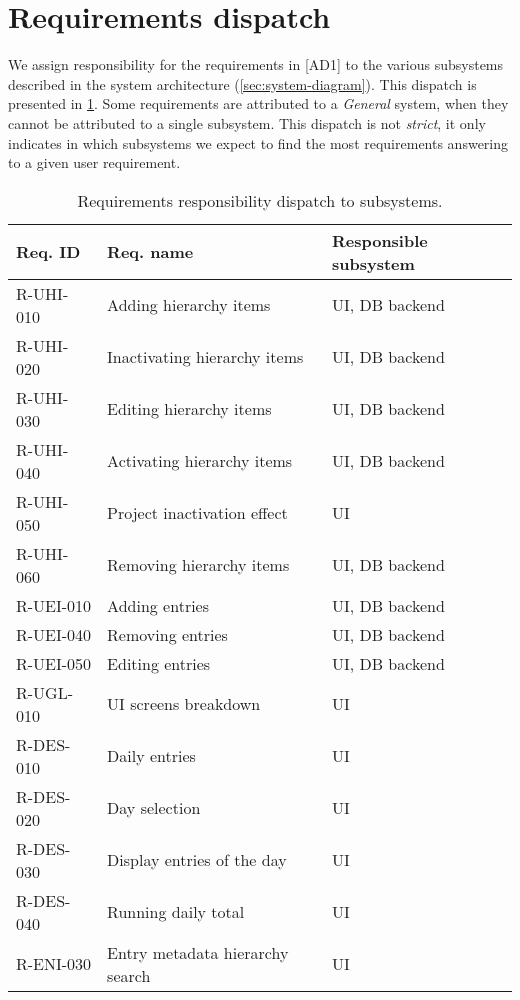 \section{Requirements dispatch} \label{sec:req-dispatch}
We assign responsibility for the requirements in [AD1] to the various subsystems
described in the system architecture (\cref{sec:system-diagram}). This dispatch
is presented in \cref{tab:req-dispatch}. Some requirements are attributed
to a \emph{General} system, when they cannot be attributed to a single
subsystem. This dispatch is not \emph{strict}, it only indicates in which
subsystems we expect to find the most requirements answering to a given
user requirement.

\begin{longtable}{| p{} |
                    p{} |
                    p{} |}
  \caption{\label{tab:req-dispatch} Requirements responsibility dispatch to
    subsystems.} \\ \hline
  \textbf{Req. ID} & \textbf{Req. name} & \textbf{Responsible subsystem} \\ \hline
  R-UHI-010 & Adding hierarchy items & UI, DB backend \\ \hline
  R-UHI-020 & Inactivating hierarchy items & UI, DB backend \\ \hline
  R-UHI-030 & Editing hierarchy items & UI, DB backend \\ \hline
  R-UHI-040 & Activating hierarchy items & UI, DB backend \\ \hline
  R-UHI-050 & Project inactivation effect & UI \\ \hline
  R-UHI-060 & Removing hierarchy items & UI, DB backend \\ \hline
  R-UEI-010 & Adding entries & UI, DB backend \\ \hline
  R-UEI-040 & Removing entries & UI, DB backend \\ \hline
  R-UEI-050 & Editing entries & UI, DB backend \\ \hline
  R-UGL-010 & UI screens breakdown & UI \\ \hline
  R-DES-010 & Daily entries & UI \\ \hline
  R-DES-020 & Day selection & UI \\ \hline
  R-DES-030 & Display entries of the day & UI \\ \hline
  R-DES-040 & Running daily total & UI \\ \hline
  R-ENI-030 & Entry metadata hierarchy search & UI \\ \hline

\end{longtable}
